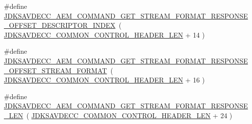 \begin{DoxyCompactItemize}
\item 
\#define \hyperlink{group__command__get__stream__format__response_ga04b7057e5f45634c94b3c5d346950068}{J\+D\+K\+S\+A\+V\+D\+E\+C\+C\+\_\+\+A\+E\+M\+\_\+\+C\+O\+M\+M\+A\+N\+D\+\_\+\+G\+E\+T\+\_\+\+S\+T\+R\+E\+A\+M\+\_\+\+F\+O\+R\+M\+A\+T\+\_\+\+R\+E\+S\+P\+O\+N\+S\+E\+\_\+\+O\+F\+F\+S\+E\+T\+\_\+\+D\+E\+S\+C\+R\+I\+P\+T\+O\+R\+\_\+\+I\+N\+D\+EX}~( \hyperlink{group__jdksavdecc__avtp__common__control__header_gaae84052886fb1bb42f3bc5f85b741dff}{J\+D\+K\+S\+A\+V\+D\+E\+C\+C\+\_\+\+C\+O\+M\+M\+O\+N\+\_\+\+C\+O\+N\+T\+R\+O\+L\+\_\+\+H\+E\+A\+D\+E\+R\+\_\+\+L\+EN} + 14 )
\item 
\#define \hyperlink{group__command__get__stream__format__response_ga7c39f9ec657a6331b5b12a126dc02a1e}{J\+D\+K\+S\+A\+V\+D\+E\+C\+C\+\_\+\+A\+E\+M\+\_\+\+C\+O\+M\+M\+A\+N\+D\+\_\+\+G\+E\+T\+\_\+\+S\+T\+R\+E\+A\+M\+\_\+\+F\+O\+R\+M\+A\+T\+\_\+\+R\+E\+S\+P\+O\+N\+S\+E\+\_\+\+O\+F\+F\+S\+E\+T\+\_\+\+S\+T\+R\+E\+A\+M\+\_\+\+F\+O\+R\+M\+AT}~( \hyperlink{group__jdksavdecc__avtp__common__control__header_gaae84052886fb1bb42f3bc5f85b741dff}{J\+D\+K\+S\+A\+V\+D\+E\+C\+C\+\_\+\+C\+O\+M\+M\+O\+N\+\_\+\+C\+O\+N\+T\+R\+O\+L\+\_\+\+H\+E\+A\+D\+E\+R\+\_\+\+L\+EN} + 16 )
\item 
\#define \hyperlink{group__command__get__stream__format__response_gaeb316ba063dd01f9a1b11429a37e2af4}{J\+D\+K\+S\+A\+V\+D\+E\+C\+C\+\_\+\+A\+E\+M\+\_\+\+C\+O\+M\+M\+A\+N\+D\+\_\+\+G\+E\+T\+\_\+\+S\+T\+R\+E\+A\+M\+\_\+\+F\+O\+R\+M\+A\+T\+\_\+\+R\+E\+S\+P\+O\+N\+S\+E\+\_\+\+L\+EN}~( \hyperlink{group__jdksavdecc__avtp__common__control__header_gaae84052886fb1bb42f3bc5f85b741dff}{J\+D\+K\+S\+A\+V\+D\+E\+C\+C\+\_\+\+C\+O\+M\+M\+O\+N\+\_\+\+C\+O\+N\+T\+R\+O\+L\+\_\+\+H\+E\+A\+D\+E\+R\+\_\+\+L\+EN} + 24 )
\end{DoxyCompactItemize}
